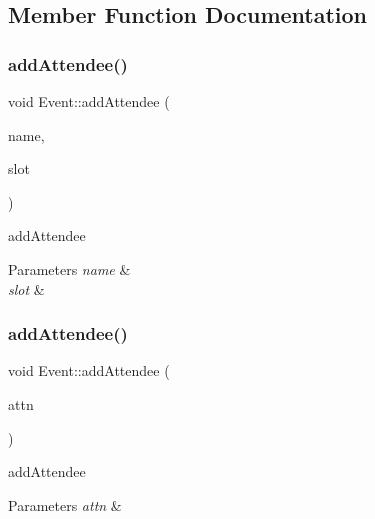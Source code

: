\subsection{Member Function Documentation}
\mbox{\label{class_event_a0940f63f5ac2324d7c61e204ed782bd0}} 
\subsubsection{\texorpdfstring{add\+Attendee()}{addAttendee()}\hspace{0.1cm}{\footnotesize\ttfamily [1/3]}}
{\footnotesize\ttfamily void Event\+::add\+Attendee (\begin{DoxyParamCaption}\item[{Q\+String}]{name,  }\item[{int}]{slot }\end{DoxyParamCaption})}



add\+Attendee 


\begin{DoxyParams}{Parameters}
{\em name} & \\
\hline
{\em slot} & \\
\hline
\end{DoxyParams}
\mbox{\label{class_event_a7be36f174942f39cab6917d09e139a14}} 
\subsubsection{\texorpdfstring{add\+Attendee()}{addAttendee()}\hspace{0.1cm}{\footnotesize\ttfamily [2/3]}}
{\footnotesize\ttfamily void Event\+::add\+Attendee (\begin{DoxyParamCaption}\item[{\hyperlink{classattendee}{attendee} $\ast$}]{attn }\end{DoxyParamCaption})}



add\+Attendee 


\begin{DoxyParams}{Parameters}
{\em attn} & \\
\hline
\end{DoxyParams}
\mbox{\label{class_event_abd8ba2203b1fc2e1c66280ed2d63adda}} 
